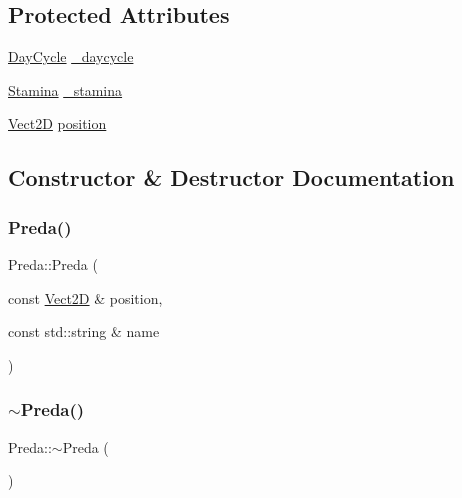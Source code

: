\subsection*{Protected Attributes}
\begin{DoxyCompactItemize}
\item 
\hyperlink{classDayCycle}{Day\+Cycle} \hyperlink{classFish_a4b8a32e2a5165ddd1f8af27f4346b3eb_a4b8a32e2a5165ddd1f8af27f4346b3eb}{\+\_\+daycycle}
\item 
\hyperlink{classStamina}{Stamina} \hyperlink{classFish_a4948331d0f556344bda8314828eec8dd_a4948331d0f556344bda8314828eec8dd}{\+\_\+stamina}
\item 
\hyperlink{classVect2D}{Vect2D} \hyperlink{classCartesianObject2D_ae02ec6ed11f9bfc0c748da033d6a32f9_ae02ec6ed11f9bfc0c748da033d6a32f9}{position}
\end{DoxyCompactItemize}


\subsection{Constructor \& Destructor Documentation}
\mbox{\label{classPreda_aeddef5ec6e57cc15875046523d8ed119_aeddef5ec6e57cc15875046523d8ed119}} 
\subsubsection{\texorpdfstring{Preda()}{Preda()}}
{\footnotesize\ttfamily Preda\+::\+Preda (\begin{DoxyParamCaption}\item[{const \hyperlink{classVect2D}{Vect2D} \&}]{position,  }\item[{const std\+::string \&}]{name }\end{DoxyParamCaption})}

\mbox{\label{classPreda_ab33b836828f2273af29692406d985a8b_ab33b836828f2273af29692406d985a8b}} 
\subsubsection{\texorpdfstring{$\sim$\+Preda()}{~Preda()}}
{\footnotesize\ttfamily Preda\+::$\sim$\+Preda (\begin{DoxyParamCaption}{ }\end{DoxyParamCaption})\hspace{0.3cm}{\ttfamily [virtual]}}



